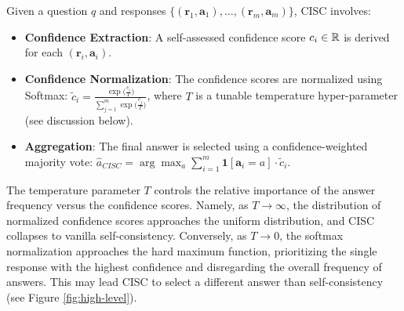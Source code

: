 \begin{definition}
\label{def:cisc}
Given a question $q$ and responses $\{(\textbf{r}_1, \textbf{a}_1), \dots, (\textbf{r}_m, \textbf{a}_m) \}$, CISC involves:

\begin{itemize}
    \item \textbf{Confidence Extraction}: A self-assessed confidence score $c_i\in\mathbb{R}$ is derived for each $(\textbf{r}_i, \textbf{a}_i)$.
    \item \textbf{Confidence Normalization}: The confidence scores are normalized
    using Softmax: $\tilde{c}_i = \frac{\exp\!\bigl(\frac{c_i}{T}\bigr)}{\sum_{j=1}^m \exp\!\bigl(\tfrac{c_j}{T}\bigr)}$, where $T$ is a tunable temperature hyper-parameter (see discussion below).
    \item \textbf{Aggregation}:  The final answer is selected using a confidence-weighted majority vote: $\hat{a}_{CISC} = \arg\max_a\sum_{i=1}^m \textbf{1}[\textbf{a}_i = a]\cdot \tilde{c}_i$. 
\end{itemize}
\end{definition}

The temperature parameter $T$ controls the relative importance of the answer frequency versus the confidence scores. Namely, as $T\to \infty$, the distribution of normalized confidence scores approaches the uniform distribution, and CISC collapses to vanilla self-consistency. Conversely, as $T\to 0$,  the softmax normalization approaches the hard maximum function, prioritizing the single response with the highest confidence and disregarding the overall frequency of answers. This may lead CISC to select a different answer than self-consistency (see Figure \ref{fig:high-level}). 
